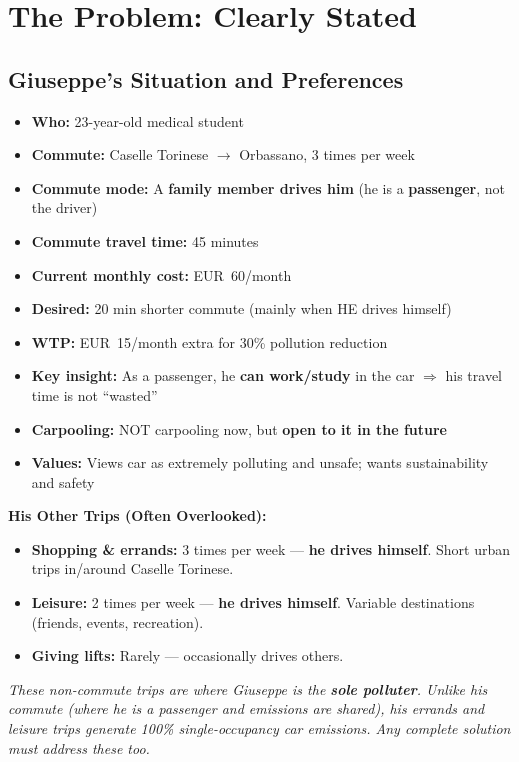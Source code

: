 \documentclass[11pt,a4paper]{article}
\begin{document}
\section{The Problem: Clearly Stated}
\label{sec:problem}

\subsection{Giuseppe's Situation and Preferences}

\begin{tcolorbox}[colback=lightblue,colframe=deepblue,title=\textbf{Giuseppe's Complete Profile (with all Q\&A Clarifications)}]
\begin{itemize}[noitemsep]
    \item \textbf{Who:} 23-year-old medical student
    \item \textbf{Commute:} Caselle Torinese $\rightarrow$ Orbassano, 3 times per week
    \item \textbf{Commute mode:} A \textbf{family member drives him} (he is a \textbf{passenger}, not the driver)
    \item \textbf{Commute travel time:} 45 minutes
    \item \textbf{Current monthly cost:} EUR~60/month
    \item \textbf{Desired:} 20 min shorter commute (mainly when HE drives himself)
    \item \textbf{WTP:} EUR~15/month extra for 30\% pollution reduction
    \item \textbf{Key insight:} As a passenger, he \textbf{can work/study} in the car $\Rightarrow$ his travel time is not ``wasted''
    \item \textbf{Carpooling:} NOT carpooling now, but \textbf{open to it in the future}
    \item \textbf{Values:} Views car as extremely polluting and unsafe; wants sustainability and safety
\end{itemize}
\vspace{4pt}
\textbf{His Other Trips (Often Overlooked):}
\begin{itemize}[noitemsep]
    \item \textbf{Shopping \& errands:} 3 times per week --- \textbf{he drives himself}. Short urban trips in/around Caselle Torinese.
    \item \textbf{Leisure:} 2 times per week --- \textbf{he drives himself}. Variable destinations (friends, events, recreation).
    \item \textbf{Giving lifts:} Rarely --- occasionally drives others.
\end{itemize}
\textit{These non-commute trips are where Giuseppe is the \textbf{sole polluter}. Unlike his commute (where he is a passenger and emissions are shared), his errands and leisure trips generate 100\% single-occupancy car emissions. Any complete solution must address these too.}
\end{tcolorbox}
\end{document}
